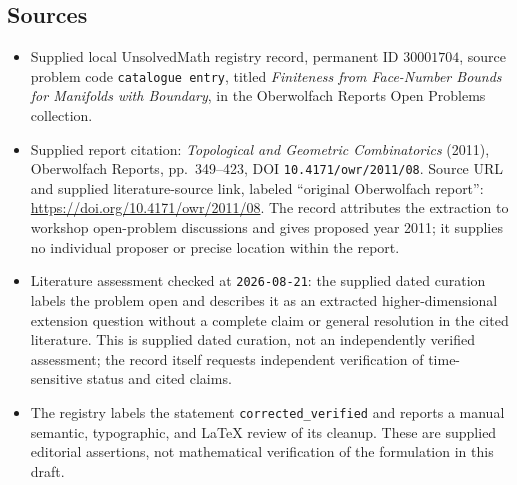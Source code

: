 \documentclass[11pt]{article}
\begin{document}
\subsection{Sources}
\begin{itemize}
\item Supplied local UnsolvedMath registry record, permanent ID \(30001704\), source problem code \texttt{catalogue entry}, titled \emph{Finiteness from Face-Number Bounds for Manifolds with Boundary}, in the Oberwolfach Reports Open Problems collection.
\item Supplied report citation: \emph{Topological and Geometric Combinatorics} (2011), Oberwolfach Reports, pp.\ 349--423, DOI \texttt{10.4171/owr/2011/08}. Source URL and supplied literature-source link, labeled ``original Oberwolfach report'': \url{https://doi.org/10.4171/owr/2011/08}. The record attributes the extraction to workshop open-problem discussions and gives proposed year 2011; it supplies no individual proposer or precise location within the report.
\item Literature assessment checked at \texttt{2026-08-21}: the supplied dated curation labels the problem open and describes it as an extracted higher-dimensional extension question without a complete claim or general resolution in the cited literature. This is supplied dated curation, not an independently verified assessment; the record itself requests independent verification of time-sensitive status and cited claims.
\item The registry labels the statement \texttt{corrected\_verified} and reports a manual semantic, typographic, and LaTeX review of its cleanup. These are supplied editorial assertions, not mathematical verification of the formulation in this draft.
\end{itemize}
\end{document}
